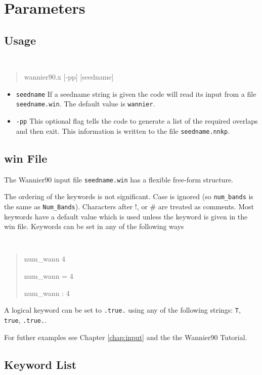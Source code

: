 \chapter{Parameters}

\section{Usage}
{\tt
\begin{quote}
wannier90.x [-pp] [seedname]
\end{quote} }
\begin{itemize}
\item{ {\tt seedname} If a seedname string is given the code will read its input
from a file {\tt seedname.win}. The default value is {\tt wannier}.}
\item { {\tt -pp} This optional flag tells the code to generate
a list of the required overlaps and then exit. 
This information is written to the file {\tt seedname.nnkp}.}
\end{itemize}

\section{win File}
The Wannier90 input file {\tt seedname.win} has a flexible free-form structure.

The ordering of the keywords is not significant. Case is ignored (so
\verb#num_bands# is the same as \verb#Num_Bands#). Characters after !, or \#
are treated as comments. Most keywords have a default value which is
used unless the keyword is 
given in the win file. Keywords can be set in any of the following ways
{\tt
\begin{quote}
num\_wann   4

num\_wann = 4

num\_wann : 4
\end{quote} }
A logical keyword can be set to {\tt .true.} using any of the following
strings: {\tt T}, {\tt true}, {\tt .true.}.

 For futher examples see Chapter \ref{chap:input} and the
 the Wannier90 Tutorial.


\section{Keyword List}
\label{parameter_data}

